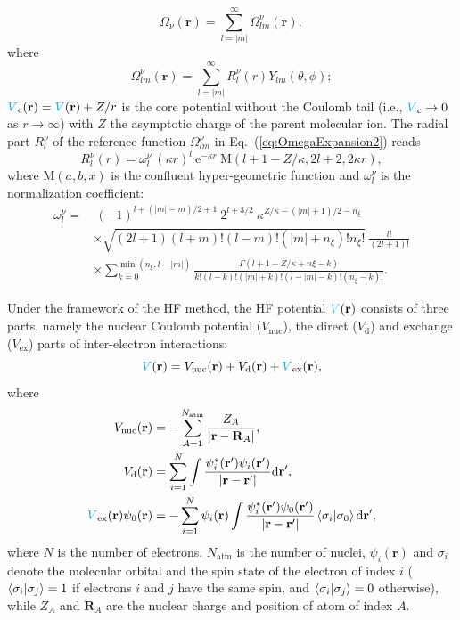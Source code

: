 \documentclass[preprint,12pt]{elsarticle} %
\newcommand{\bn}[1]{\mathbf{#1}}    %
\renewcommand{\rm}[1]{\mathrm{#1}}    %
\newcommand{\dd}{\mathrm{d}}    %
\newcommand{\ee}{\mathrm{e}}    %
\newcommand{\abs}[1]{\lvert #1 \rvert}  %
\newcommand{\cyan}[1]{\textcolor{cyan}{#1}}     %
\begin{document}
\begin{equation}
    \Omega_\nu(\bn{r}) = \sum_{l=|m|}^{\infty} \Omega^\nu_{lm}(\bn{r}),
    \label{eq:OmegaExpansion1}
\end{equation}
where
\begin{equation}
    \Omega^\nu_{lm}(\bn{r}) = \sum_{l=|m|}^{\infty} R_l^\nu(r) Y_{lm}(\theta, \phi);
    \label{eq:OmegaExpansion2}
\end{equation}
$\cyan{V}_{\rm{c}}(\bn{r}) = \cyan{V}(\bn{r}) + Z/r$ is the core potential without the Coulomb tail (i.e., $\cyan{V}_{\rm{c}} \rightarrow 0$ as $r\rightarrow \infty$) with $Z$ the asymptotic charge of the parent molecular ion.
The radial part $R_l^\nu$ of the reference function $\Omega_{lm}^\nu$ in Eq.~(\ref{eq:OmegaExpansion2}) reads
\begin{equation}
    R_l^\nu(r)=\omega_l^\nu \ (\kappa r)^l \ \ee^{-\kappa r} \ \rm{M}(l+1-Z/\kappa, 2l+2, 2 \kappa r),
\end{equation}
where $\rm{M}(a, b, x)$ is the confluent hyper-geometric function \cite{olver_nist_2010} and $\omega_l^\nu$ is the normalization coefficient:
\begin{align}
    \omega_l^\nu = & \      (-1)^{l+(\abs{m}-m)/2+1}\ 2^{l+3/2}\ \kappa^{Z/\kappa-(\abs{m}+1)/2-n_\xi} \nonumber \\
                   & \times \sqrt{(2l+1)(l+m)!(l-m)!(\abs{m}+n_\xi)!n_\xi!}\ \frac{l!}{(2l+1)!} \nonumber \\
                   & \times \!\!\!\!\!\! \sum_{k=0}^{\min{(n_\xi,l-\abs{m})}} \!\!\!\!\!\!\!\!\!\! \frac{\Gamma(l+1-Z/\kappa+n\xi-k)}{k!(l-k)!(\abs{m}+k)!(l-\abs{m}-k)!(n_\xi-k)!}.
\end{align}

Under the framework of the HF method, the HF potential $\cyan{V}(\bn{r})$ consists of three parts, namely the nuclear Coulomb potential ($V_{\rm{nuc}}$), the direct ($V_{\rm{d}}$) and exchange ($V_{\rm{ex}}$) parts of inter-electron interactions:
\begin{equation}
    \cyan{V}(\bn{r}) = V_{\rm{nuc}}(\bn{r}) + V_{\rm{d}}(\bn{r}) + \cyan{V}_{\rm{ex}}(\bn{r}),
\end{equation}
where
\begin{align}
    V_{\rm{nuc}}(\bn{r}) &= -\sum_{A=1}^{N_{\rm{atm}}} \frac{Z_A}{\left|\bn{r}-\bn{R}_A\right|}, \label{eq:Vnuc} \\
    V_{\rm{d}}(\bn{r}) &= \sum_{i=1}^N \int \frac{\psi_i^*(\bn{r}') \psi_i(\bn{r}')}{\abs{\bn{r}-\bn{r}'}} \dd \bn{r}', \label{eq:Vd} \\
    \cyan{V}_{\rm{ex}}(\bn{r}) \psi_0(\bn{r}) &= -\sum_{i=1}^N \psi_i(\bn{r}) \int \frac{\psi_i^*(\bn{r}') \psi_0(\bn{r}')}{\abs{\bn{r}-\bn{r}'}} \braket{\sigma_i | \sigma_0} \dd \bn{r}', \label{eq:VexPsi0}
\end{align}
where $N$ is the number of electrons, $N_{\rm{atm}}$ is the number of nuclei, $\psi_i(\bn{r})$ and $\sigma_i$ denote the molecular orbital and the spin state of the electron of index $i$ ($\braket{\sigma_i | \sigma_j}=1$ if electrons $i$ and $j$ have the same spin, and $\braket{\sigma_i | \sigma_j}=0$ otherwise), while $Z_A$ and $\bn{R}_A$ are the nuclear charge and position of atom of index $A$.
\end{document}
